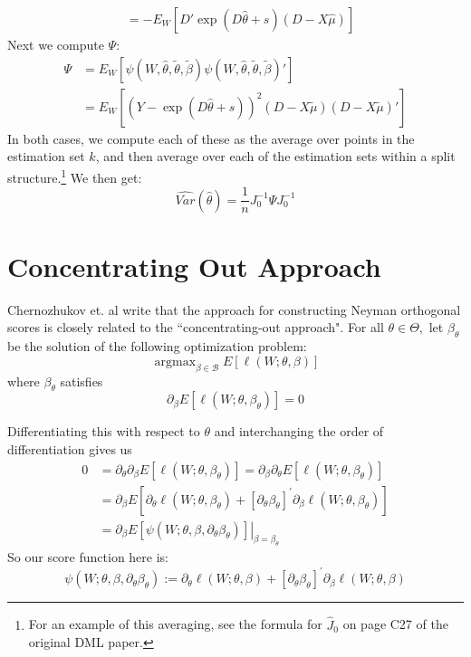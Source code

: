 \documentclass[11pt]{article}
\DeclareMathOperator*{\argmax}{argmax}
\begin{document}
\begin{enumerate}
\begin{align*}
		&= -E_W\left[D'\exp(D\hat{\theta} + s)(D - X\hat{\mu}) \right]
	\end{align*}
	Next we compute $\Psi$:
	\begin{align*}
		\Psi &= E_W\left[\psi(W, \hat{\theta},\tilde{\theta}, \tilde{\beta})\psi(W, \hat{\theta},\tilde{\theta}, \tilde{\beta})'\right] \\
			&= E_W\left[(Y - \exp(D\hat{\theta} + s))^2(D - X\tilde{\mu})(D - X\tilde{\mu})'\right]
	\end{align*}
	In both cases, we compute each of these as the average over points in the estimation set $k$, and then average over each of the estimation sets within a split structure.\footnote{For an example of this averaging, see the formula for $\hat{J}_0$ on page C27 of the original DML paper.} We then get:
	$$\hat{Var}(\hat{\theta}) = \frac{1}{n} J_0^{-1} \Psi J_0^{-1}$$

\end{enumerate}


\section{Concentrating Out Approach}
Chernozhukov et. al write that the approach for constructing Neyman orthogonal scores is closely related to the ``concentrating-out approach". For all $\theta \in \Theta,$ let $\beta_{\theta}$ be the solution of the following optimization problem:
$$
\argmax_{\beta \in \mathcal{B}} E[\ell(W ; \theta, \beta)]
$$
where $\beta_\theta$ satisfies
$$\partial_{\beta} E\left[\ell\left(W ; \theta, \beta_{\theta}\right)\right]=0$$

Differentiating this with respect to $\theta$ and interchanging the order of differentiation gives us
$$\begin{aligned}
0 &=\partial_{\theta} \partial_{\beta} E\left[\ell\left(W ; \theta, \beta_{\theta}\right)\right]=\partial_{\beta} \partial_{\theta} E\left[\ell\left(W ; \theta, \beta_{\theta}\right)\right] \\
&=\partial_{\beta} E\left[\partial_{\theta} \ell\left(W ; \theta, \beta_{\theta}\right)+\left[\partial_{\theta} \beta_{\theta}\right]^{\prime} \partial_{\beta} \ell\left(W ; \theta, \beta_{\theta}\right)\right] \\
&=\left.\partial_{\beta} E\left[\psi\left(W ; \theta, \beta, \partial_{\theta} \beta_{\theta}\right)\right]\right|_{\beta=\beta_{\theta}}
\end{aligned}$$
So our score function here is:
$$\psi\left(W ; \theta, \beta, \partial_{\theta} \beta_{\theta}\right):=\partial_{\theta} \ell(W ; \theta, \beta)+\left[\partial_{\theta} \beta_{\theta}\right]^{\prime} \partial_{\beta} \ell(W ; \theta, \beta)$$
\end{document}

